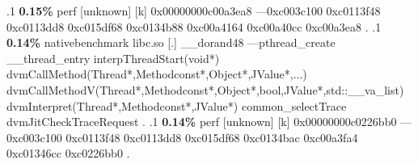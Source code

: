 \begin{profile}
{.1 \textbf{ 0.15\%} perf             [unknown]              [k] 0x00000000c00a3ea8\newline {} ---0xc003c100\newline {} 0xc0113f48\newline {} 0xc0113dd8\newline {} 0xc015df68\newline {} 0xc0134b88\newline {} 0xc00a4164\newline {} 0xc00a40cc\newline {} 0xc00a3ea8\newline {} . 
.1 \textbf{ 0.14\%} nativebenchmark  libc.so                [.] \_\_dorand48\newline {} ---pthread\_create\newline {} \_\_thread\_entry\newline {} interpThreadStart(void*)\newline {} dvmCallMethod(Thread*,Methodconst*,Object*,JValue*,...)\newline {} dvmCallMethodV(Thread*,Methodconst*,Object*,bool,JValue*,std::\_\_va\_list)\newline {} dvmInterpret(Thread*,Methodconst*,JValue*)\newline {} common\_selectTrace\newline {} dvmJitCheckTraceRequest\newline {} . 
.1 \textbf{ 0.14\%} perf             [unknown]              [k] 0x00000000c0226bb0\newline {} ---0xc003c100\newline {} 0xc0113f48\newline {} 0xc0113dd8\newline {} 0xc015df68\newline {} 0xc0134bac\newline {} 0xc00a3fa4\newline {} 0xc01346cc\newline {} 0xc0226bb0\newline {} . 
}
\end{profile}
